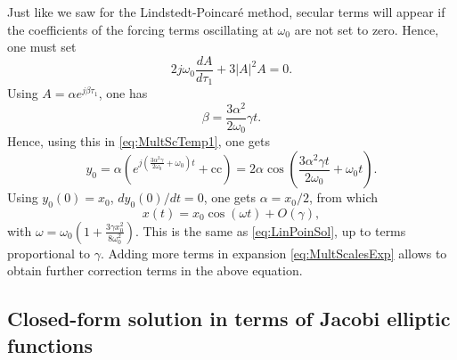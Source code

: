 \documentclass[11pt,twoside,a4paper,english]{book}
\begin{document}
Just like we saw for the Lindstedt-Poincar{\'e} method, secular terms will appear if the coefficients of the forcing terms oscillating at $\omega_0$ are not set to zero. Hence, one must set
\begin{equation}
2j\omega_0\frac{dA}{d\tau_1} + 3|A|^2 A = 0.
\end{equation}
Using $A = \alpha e^{j\beta \tau_1}$, one has 
\begin{equation}
\beta = \frac{3 \alpha^2}{2\omega_0}\gamma t .
\end{equation}
Hence, using this in \eqref{eq:MultScTemp1}, one gets
\begin{equation}
y_0 = \alpha \left(e^{j\left(\frac{3 \alpha^2 \gamma}{2\omega_0}+ \omega_0 \right)t} + \text{cc} \right) = 2\alpha \cos\left(\frac{3 \alpha^2 \gamma t}{2\omega_0}+ \omega_0 t\right).
\end{equation}
Using $y_0(0) = x_0$, $dy_0(0)/dt = 0$, one gets $\alpha = x_0/2$, from which
\begin{equation}
x(t) = x_0 \cos\left(\omega t\right) + O(\gamma),
\end{equation}
with $\omega = \omega_0\left(1 + \frac{3\gamma x_0^2}{8 \omega_0^2}\right)$. This is the same as \eqref{eq:LinPoinSol}, up to terms proportional to $\gamma$. Adding more terms in expansion \eqref{eq:MultScalesExp} allows to obtain further correction terms in the above equation. 







\subsection{Closed-form solution in terms of Jacobi elliptic functions}
\end{document}
